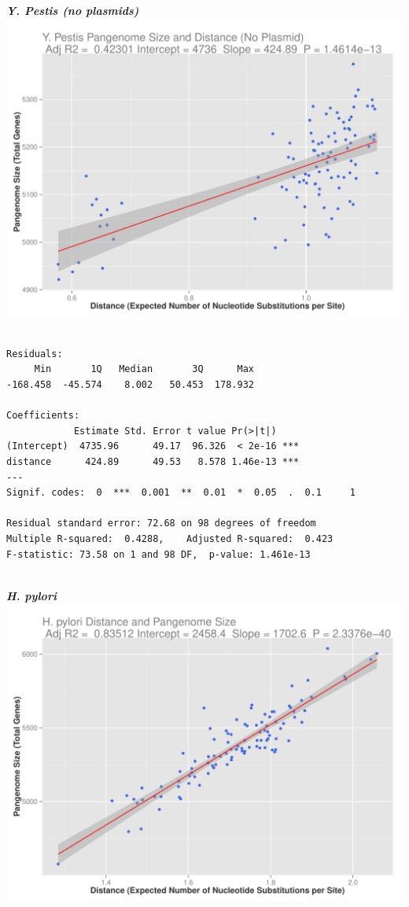\documentclass[12pt]{article}
\begin{document}
\newpage

{\large \textbf{\textit{Y. Pestis (no plasmids)}}\\}
\includegraphics[width=\textwidth]{ypestnoplasmplot.pdf}


\begin{lstlisting}

Residuals:
     Min       1Q   Median       3Q      Max 
-168.458  -45.574    8.002   50.453  178.932 

Coefficients:
            Estimate Std. Error t value Pr(>|t|)    
(Intercept)  4735.96      49.17  96.326  < 2e-16 ***
distance      424.89      49.53   8.578 1.46e-13 ***
---
Signif. codes:  0  ***  0.001  **  0.01  *  0.05  .  0.1     1

Residual standard error: 72.68 on 98 degrees of freedom
Multiple R-squared:  0.4288,    Adjusted R-squared:  0.423 
F-statistic: 73.58 on 1 and 98 DF,  p-value: 1.461e-13


\end{lstlisting}

\newpage

{\large \textbf{\textit{H. pylori}}\\}
\includegraphics[width=\textwidth]{hpyloriplot.pdf}
\end{document}

